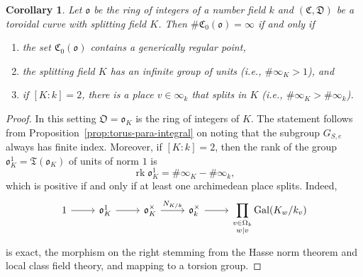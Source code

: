 \documentclass[a4paper, twoside, 11pt]{amsart}
\newtheorem{corollary}[theorem]{Corollary}
\theoremstyle{definition}
\newcommand{\mC}{\mathfrak{C}}
\newcommand{\mD}{\mathfrak{D}}
\newcommand{\mT}{\mathfrak{T}}
\newcommand{\fo}{\mathfrak{o}}
\newcommand{\fO}{\mathfrak{O}}
\DeclareMathOperator{\Gal}{Gal}
\DeclareMathOperator{\rk}{rk}
\begin{document}
\begin{corollary}\label{cor:torus-infinite-numberfield}
	Let $\fo$ be the ring of integers of a number field $k$ and $(\mC,\mD)$ be a toroidal curve with splitting field $K$.
	Then $\# \mC_0(\fo) = \infty$ if and only if
	\begin{enumerate}
    	\item the set $\mC_0(\fo)$ contains a generically regular point,
    	\item the splitting field $K$ has an infinite group of units (i.e., $\#\infty_K > 1$), and
    	\item if $[K:k]=2$, there is a place $v\in \infty_k$ that splits in $K$ (i.e., $\#\infty_K>\#\infty_k$).
	\end{enumerate}
\end{corollary}
\begin{proof}
	In this setting $\fO=\fo_K$ is the ring of integers of $K$. The statement follows from Proposition~\ref{prop:torus-para-integral} on noting that the subgroup $G_{S,e}$ always has finite index. Moreover, if $[K:k]=2$, then the rank of the group $\fo_K^1=\mT(\fo_K)$ of units of norm $1$ is
	\begin{equation}\label{eq:norm-1-rank}
		\rk\fo_K^1=\#\infty_K - \#\infty_k,
	\end{equation}
	which is positive if and only if at least one archimedean place splits.
	Indeed, 
	\begin{equation*}
		\begin{tikzcd}
			1 \arrow[r] & \fo_K^1 \arrow[r] & \fo_K^\times \arrow[r, "N_{K/k}"] & \fo_k^\times \ar[r]& \displaystyle\prod_{\substack{v\in \Omega_k\\w\mid v}} \Gal(K_w/k_v) 
		\end{tikzcd}
	\end{equation*}
	is exact, the morphism on the right stemming from the Hasse norm theorem and local class field theory, and mapping to a torsion group.
\end{proof}
\end{document}
